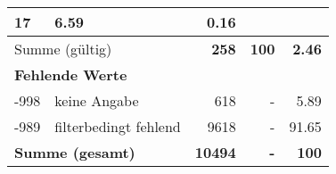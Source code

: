 \begin{longtable}{lXrrr}
       \num{17} &
       \num[round-mode=places,round-precision=2]{6,59} &
         \num[round-mode=places,round-precision=2]{0,16} \\
     \midrule
     \multicolumn{2}{l}{Summe (gültig)} &
       \textbf{\num{258}} &
     \textbf{100} &
       \textbf{\num[round-mode=places,round-precision=2]{2,46}} \\
     \multicolumn{5}{l}{\textbf{Fehlende Werte}}\\
       -998 &
       keine Angabe &
         \num{618} &
        - &
         \num[round-mode=places,round-precision=2]{5,89} \\
       -989 &
       filterbedingt fehlend &
         \num{9618} &
        - &
         \num[round-mode=places,round-precision=2]{91,65} \\
     \midrule
     \multicolumn{2}{l}{\textbf{Summe (gesamt)}} &
          \textbf{\num{10494}} &
        \textbf{-} &
        \textbf{100} \\
     \bottomrule
     \end{longtable}
     
